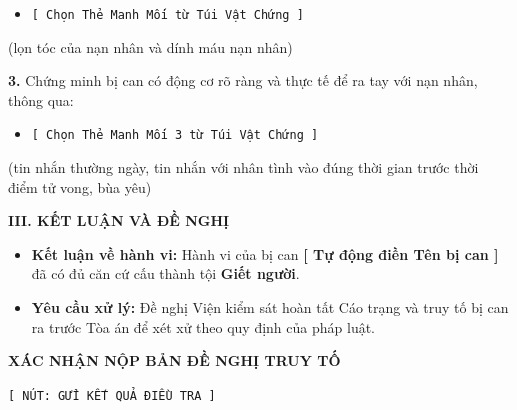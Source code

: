 \documentclass[12pt,a4paper]{article}
\begin{document}
\begin{itemize}[leftmargin=*, itemsep=2pt, topsep=2pt, parsep=0pt]
  \item \texttt{[ Chọn Thẻ Manh Mối từ Túi Vật Chứng ]}
\end{itemize}
(lọn tóc của nạn nhân và dính máu nạn nhân)


\textbf{3.} Chứng minh bị can có động cơ rõ ràng và thực tế để ra tay với nạn nhân, thông qua:

\begin{itemize}[leftmargin=*, itemsep=2pt, topsep=2pt, parsep=0pt]
  \item \texttt{[ Chọn Thẻ Manh Mối 3 từ Túi Vật Chứng ]}
\end{itemize}
(tin nhắn thường ngày, tin nhắn với nhân tình vào đúng thời gian trước thời điểm tử vong, bùa yêu)




\vspace{0.3cm}\noindent\textbf{\large III. KẾT LUẬN VÀ ĐỀ NGHỊ}\\[0.15cm]


\begin{itemize}[leftmargin=*, itemsep=2pt, topsep=2pt, parsep=0pt]
  \item \textbf{Kết luận về hành vi:} Hành vi của bị can \textbf{[ Tự động điền Tên bị can ]} đã có đủ căn cứ cấu thành tội \textbf{Giết người}.
  \item \textbf{Yêu cầu xử lý:} Đề nghị Viện kiểm sát hoàn tất Cáo trạng và truy tố bị can ra trước Tòa án để xét xử theo quy định của pháp luật.


\end{itemize}
\textbf{XÁC NHẬN NỘP BẢN ĐỀ NGHỊ TRUY TỐ}

\texttt{[ NÚT: GỬI KẾT QUẢ ĐIỀU TRA ]}
\end{document}

